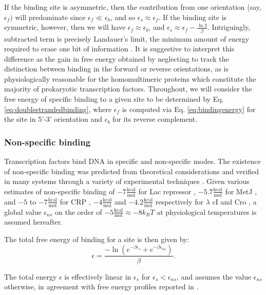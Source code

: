 \documentclass{article}
\begin{document}
If the binding site is asymmetric, then the contribution from one
orientation (say, $\epsilon_f)$ will predominate since $\epsilon_f \ll
\epsilon_b$, and so $\epsilon_s \approx \epsilon_f$.  If the binding
site is symmetric, however, then we will have $\epsilon_f \approx
\epsilon_b$, and $\epsilon_s \approx \epsilon_f - \frac{\ln
  2}{\beta}$.  Intriguingly, subtracted term is precisely Landauer's
limit, the minimum amount of energy required to erase one bit of
information  \cite{landauer61}. It is suggestive to interpret this
difference as the gain in free energy obtained by neglecting to track
the distinction between binding in the forward or reverse
orientations, as is physiologically reasonable for the homomultimeric
proteins which constitute the majority of prokaryotic transcription
factors.  Throughout, we will consider the free energy of specific
binding to a given site to be determined by
Eq. \ref{eq:doublestrandedbinding}, where $\epsilon_f$ is computed via
Eq. \ref{eq:bindingenergy} for the site in 5'-3' orientation and
$\epsilon_b$ for its reverse complement.

\subsubsection{Non-specific binding}
Transcription factors bind DNA in specific and non-specific modes.
The existence of non-specific binding was predicted from theoretical
considerations \cite{kaohuang77} and verified in many systems through
a variety of experimental techniques \cite{revzin90}.  Given various
estimates of non-specific binding of
$-7\frac{\mathrm{kcal}}{\textrm{mol}}$ for Lac repressor
\cite{wang77}, $-5.7\frac{\mathrm{kcal}}{\textrm{mol}}$ for MetJ
\cite{augustus10}, and $-5$ to $-7 \frac{\mathrm{kcal}}{\textrm{mol}}$
for CRP \cite{takahashi79}, $-4\frac{\mathrm{kcal}}{\textrm{mol}}$ and
$-4.2 \frac{\mathrm{kcal}}{\textrm{mol}}$ respectively for $\lambda$
cI and Cro \cite{bakk2004}, a global value $\epsilon_{ns}$ on the
order of $-5\frac{\mathrm{kcal}}{\textrm{mol}}\approx -8 k_BT$ at
physiological temperatures is assumed hereafter.

The total free energy of binding for a site is then given by:
\begin{equation}
  \epsilon = \frac{-\ln(e^{-\beta \epsilon_s} + e^{-\beta \epsilon_{ns}})}{\beta}.\label{eq:totalbindingenergy}
\end{equation}

  The total energy $\epsilon$ is effectively linear in $\epsilon_s$ for $\epsilon_s < \epsilon_{ns}$, and assumes the value $\epsilon_{ns}$ otherwise, in agreement with free energy profiles reported in \cite{maerkl2007}.
\end{document}
